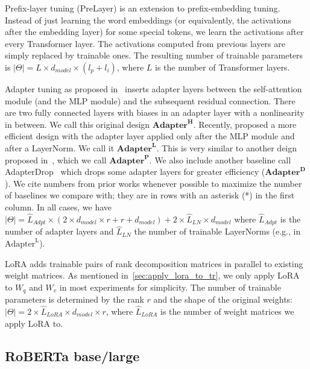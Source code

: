 \documentclass{article} %
\begin{document}
Prefix-layer tuning (PreLayer) is an extension to prefix-embedding tuning.
Instead of just learning the word embeddings (or equivalently, the activations after the embedding layer) for some special tokens, we learn the activations after every Transformer layer.
The activations computed from previous layers are simply replaced by trainable ones.
The resulting number of trainable parameters is $|\Theta| = L \times d_{model} \times (l_p + l_i)$, where $L$ is the number of Transformer layers.

Adapter tuning as proposed in~\citet{houlsby_parameter-efficient_2019} inserts adapter layers between the self-attention module (and the MLP module) and the subsequent residual connection.
There are two fully connected layers with biases in an adapter layer with a nonlinearity in between.
We call this original design $\textbf{Adapter}^{\textbf{H}}$.
Recently, \citet{lin-etal-2020-exploring} proposed a more efficient design with the adapter layer applied only after the MLP module and after a LayerNorm.
We call it $\textbf{Adapter}^{\textbf{L}}$.
This is very similar to another deign proposed in~\citet{pfeiffer2021adapterfusion}, which we call $\textbf{Adapter}^{\textbf{P}}$.
We also include another baseline call AdapterDrop~\citep{ruckle2020adapterdrop} which drops some adapter layers for greater efficiency ($\textbf{Adapter}^{\textbf{D}}$).
We cite numbers from prior works whenever possible to maximize the number of baselines we compare with; they are in rows with an asterisk (*) in the first column.
In all cases,  we have $|\Theta| = \hat{L}_{Adpt} \times (2 \times d_{model} \times r + r + d_{model}) + 2 \times \hat{L}_{LN} \times d_{model}$ where $\hat{L}_{Adpt}$ is the number of adapter layers and $\hat{L}_{LN}$ the number of trainable LayerNorms (e.g., in $\text{Adapter}^{\text{L}}$).

LoRA adds trainable pairs of rank decomposition matrices in parallel to existing weight matrices.
As mentioned in~\autoref{sec:apply_lora_to_tr}, we only apply LoRA to $W_{q}$ and $W_{v}$ in most experiments for simplicity.
The number of trainable parameters is determined by the rank $r$ and the shape of the original weights: $|\Theta| = 2 \times \hat{L}_{LoRA} \times d_{model} \times r$, where $\hat{L}_{LoRA}$ is the number of weight matrices we apply LoRA to.

\subsection{RoBERTa base/large}
\label{sec:bert_expt}
\end{document}
